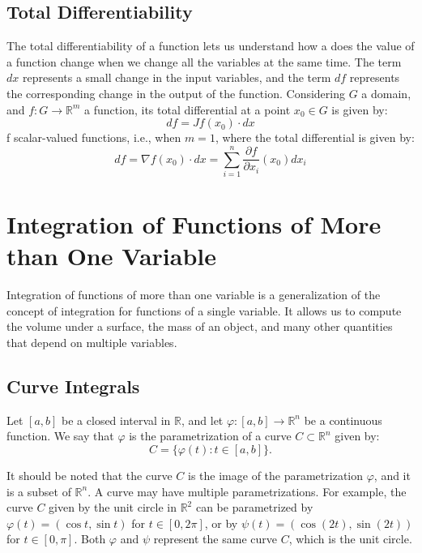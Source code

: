 \subsection{Total Differentiability}

The total differentiability of a function lets us understand how a does the value of a function change when we change all the variables at the same time. The term $dx$ represents a small change in the input variables, and the term $df$ represents the corresponding change in the output of the function. Considering $G$ a domain, and $f : G \to \mathbb{R}^m$ a function, its total differential at a point $x_0 \in G$ is given by:
\[
    df = Jf(x_0) \cdot dx
\]f scalar-valued functions, i.e., when $m=1$, where the total differential is given by:
\[
    df = \nabla f(x_0) \cdot dx = \sum_{i=1}^n \frac{\partial f}{\partial x_i}(x_0) dx_i
\]


\section{Integration of Functions of More than One Variable}

Integration of functions of more than one variable is a generalization of the concept of integration for functions of a single variable. It allows us to compute the volume under a surface, the mass of an object, and many other quantities that depend on multiple variables.

\subsection{Curve Integrals}

Let $[a, b]$ be a closed interval in $\mathbb{R}$, and let $\varphi : [a, b] \to \mathbb{R}^n$ be a continuous function. We say that $\varphi$ is the parametrization of a curve $C\subset \mathbb{R}^n$ given by:
\[
    C = \{\varphi(t) : t \in [a, b]\}.
\]
\begin{observacion}
    It should be noted that the curve $C$ is the image of the parametrization $\varphi$, and it is a subset of $\mathbb{R}^n$. A curve may have multiple parametrizations. For example, the curve $C$ given by the unit circle in $\mathbb{R}^2$ can be parametrized by $\varphi(t) = (\cos t, \sin t)$ for $t \in [0, 2\pi]$, or by $\psi(t) = (\cos(2t), \sin(2t))$ for $t \in [0, \pi]$. Both $\varphi$ and $\psi$ represent the same curve $C$, which is the unit circle.
\end{observacion}

